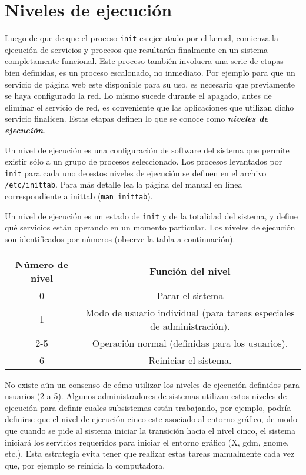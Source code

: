 \documentclass[12pt]{article}
\begin{document}
\section {Niveles de ejecución}


Luego de que de que el proceso \texttt{init} es ejecutado por el kernel, comienza 
la ejecución de servicios y procesos que resultarán finalmente en un sistema 
completamente funcional. Este proceso también involucra una serie de etapas bien 
definidas, es un proceso escalonado, no inmediato. Por ejemplo para que un servicio de página web 
este disponible para su uso, es necesario que previamente 
se haya configurado la red. Lo mismo sucede durante el apagado, antes de 
eliminar el servicio de red, es conveniente que las aplicaciones que 
utilizan dicho servicio finalicen. Estas etapas definen lo que se conoce como 
\textit{\textbf{niveles de ejecución}}.

Un nivel de ejecución es una configuración de software del sistema que permite 
existir sólo a un grupo de procesos seleccionado. Los procesos levantados por 
\texttt{init} para cada uno de estos niveles de ejecución se definen en el archivo 
\texttt{/etc/inittab}. Para más detalle lea la página del manual en línea 
correspondiente a inittab (\texttt{man inittab}).
 
Un nivel de ejecución es un estado de \texttt{init} y de la totalidad del 
sistema, y define qué servicios están operando en un momento particular. Los 
niveles de ejecución son identificados por números (observe la tabla a continuación). 

\begin{center}
\begin{tabular}{|c|c|}\hline
\rowcolor{tcA}
\textbf{Número de nivel} & \textbf{Función del nivel}\\\hline
0 & Parar el sistema\\\hline
1 & Modo de usuario individual (para tareas especiales de administración).\\\hline
2-5 & Operación normal (definidas para los usuarios).\\\hline
6 & Reiniciar el sistema.\\\hline
\end{tabular}
\end{center}

No existe aún un consenso de cómo utilizar los niveles de ejecución definidos 
para usuarios (2 a 5). Algunos administradores  
de sistemas utilizan estos niveles de ejecución para definir cuales subsistemas están trabajando, 
por ejemplo, podría definirse que el nivel de ejecución cinco este asociado al entorno gráfico, 
de modo que cuando se pide al sistema iniciar la transición hacia el nivel cinco, el sistema 
iniciará los servicios requeridos para iniciar el entorno gráfico (X, gdm, gnome, etc.). Esta 
estrategia evita tener que realizar estas tareas manualmente cada vez que, por ejemplo 
se reinicia la computadora.  
\end{document}
